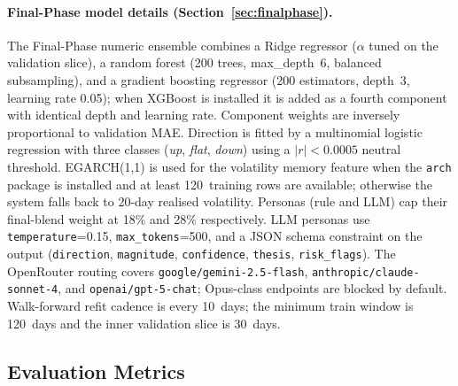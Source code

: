 \documentclass[11pt]{article}
\begin{document}
\paragraph{Final-Phase model details (Section~\ref{sec:finalphase}).}
The Final-Phase numeric ensemble combines a Ridge regressor ($\alpha$ tuned on the validation slice), a random forest (200 trees, max\_depth~6, balanced subsampling), and a gradient boosting regressor (200 estimators, depth~3, learning rate 0.05); when XGBoost is installed it is added as a fourth component with identical depth and learning rate. Component weights are inversely proportional to validation MAE. Direction is fitted by a multinomial logistic regression with three classes (\textit{up}, \textit{flat}, \textit{down}) using a $|r|<0.0005$ neutral threshold. EGARCH(1,1) is used for the volatility memory feature when the \texttt{arch} package is installed and at least 120~training rows are available; otherwise the system falls back to 20-day realised volatility. Personas (rule and LLM) cap their final-blend weight at 18\% and 28\% respectively. LLM personas use \texttt{temperature}=0.15, \texttt{max\_tokens}=500, and a JSON schema constraint on the output (\texttt{direction}, \texttt{magnitude}, \texttt{confidence}, \texttt{thesis}, \texttt{risk\_flags}). The OpenRouter routing covers \texttt{google/gemini-2.5-flash}, \texttt{anthropic/claude-sonnet-4}, and \texttt{openai/gpt-5-chat}; Opus-class endpoints are blocked by default. Walk-forward refit cadence is every 10~days; the minimum train window is 120~days and the inner validation slice is 30~days.

\subsection{Evaluation Metrics}
\end{document}
